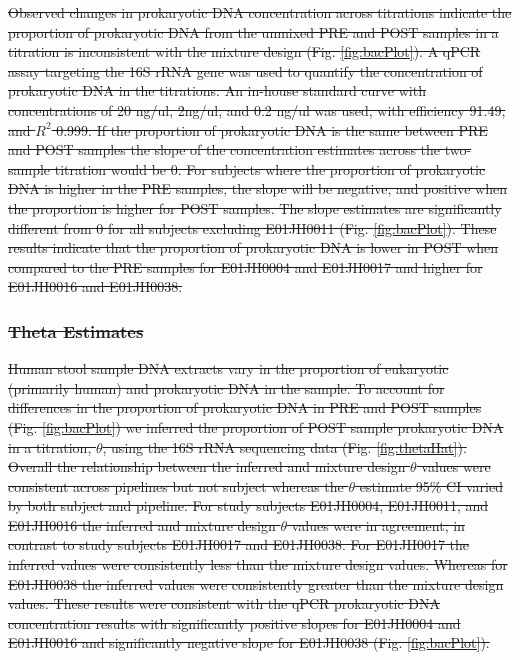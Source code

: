 \documentclass{bmcart}
\providecommand{\DIFdeltex}[1]{{\protect\color{red}\sout{#1}}}                      %
\providecommand{\DIFdelbegin}{} %
\providecommand{\DIFdel}[1]{\texorpdfstring{\DIFdeltex{#1}}{}} %
\begin{document}
\DIFdelbegin \DIFdel{Observed changes in prokaryotic DNA concentration across titrations
indicate the proportion of prokaryotic DNA from the unmixed PRE and POST
samples in a titration is inconsistent with the mixture design (Fig.
\ref{fig:bacPlot}). A qPCR assay targeting the 16S rRNA gene was used to
quantify the concentration of prokaryotic DNA in the titrations. An
in-house standard curve with concentrations of 20 ng/ul, 2ng/ul, and 0.2
ng/ul was used, with efficiency 91.49, and \(R^2\) 0.999. If the
proportion of prokaryotic DNA is the same between PRE and POST samples
the slope of the concentration estimates across the two-sample titration
would be 0. For subjects where the proportion of prokaryotic DNA is
higher in the PRE samples, the slope will be negative, and positive when
the proportion is higher for POST samples. The slope estimates are
significantly different from 0 for all subjects excluding E01JH0011
(Fig. \ref{fig:bacPlot}). These results indicate that the proportion of
prokaryotic DNA is lower in POST when compared to the PRE samples for
E01JH0004 and E01JH0017 and higher for E01JH0016 and E01JH0038.
}%

\subsubsection*{\DIFdel{Theta Estimates}}

\DIFdel{Human stool sample DNA extracts vary in the proportion of eukaryotic
(primarily human) and prokaryotic DNA in the sample. To account for
differences in the proportion of prokaryotic DNA in PRE and POST samples
(Fig. \ref{fig:bacPlot}) we inferred the proportion of POST sample
prokaryotic DNA in a titration, \(\theta\), using the 16S rRNA
sequencing data (Fig. \ref{fig:thetaHat}). Overall the relationship
between the inferred and mixture design \(\theta\) values were
consistent across pipelines but not subject whereas the \(\theta\)
estimate 95\% CI varied by both subject and pipeline. For study subjects
E01JH0004, E01JH0011, and E01JH0016 the inferred and mixture design
\(\theta\) values were in agreement, in contrast to study subjects
E01JH0017 and E01JH0038. For E01JH0017 the inferred values were
consistently less than the mixture design values. Whereas for E01JH0038
the inferred values were consistently greater than the mixture design
values. These results were consistent with the qPCR prokaryotic DNA
concentration results with significantly positive slopes for E01JH0004
and E01JH0016 and significantly negative slope for E01JH0038 (Fig.
\ref{fig:bacPlot}).
}%
\end{document}
